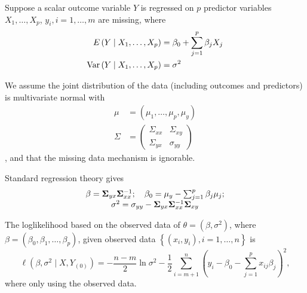 \begin{example}
	Suppose a scalar outcome variable $Y$ is regressed on $p$ predictor variables $X_{1},\ldots,X_{p}$, $y_{i},i=1,\ldots,m$ are missing, where
	\begin{equation}
		\begin{aligned}
			E\left(Y \mid X_{1}, \ldots, X_{p}\right)    & =\beta_{0}+\sum_{j=1}^{p} \beta_{j} X_{j} \\
			\mathrm{Var}\left(Y \mid X_{1}, \ldots, X_{p}\right) & =\sigma^{2}
		\end{aligned}
	\end{equation}

	We assume the joint distribution of the data (including outcomes and predictors) is multivariate normal with
	\begin{equation}
		\begin{aligned}
			\mu    & =\left(\mu_{1}, \ldots, \mu_{p}, \mu_{y}\right) \\
			\Sigma & =\left(\begin{array}{ll}
				                \Sigma_{x x} & \Sigma_{x y} \\
				                \Sigma_{y x} & \sigma_{y y}
			                \end{array}\right)
		\end{aligned}
	\end{equation}
	, and that the missing data mechanism is ignorable.

	Standard regression theory gives
	\begin{equation}
		\begin{array}{c}
			\beta=\boldsymbol{\Sigma}_{y x} \boldsymbol{\Sigma}_{x x}^{-1} ; \quad \beta_{0}=\mu_{y}-\sum_{j=1}^{p} \beta_{j} \mu_{j} ; \\
			\sigma^{2}=\sigma_{y y}-\boldsymbol{\Sigma}_{y x} \boldsymbol{\Sigma}_{x x}^{-1} \boldsymbol{\Sigma}_{x y}
		\end{array}
	\end{equation}

	The loglikelihood based on the observed data of $\theta=\left(\beta,\sigma^{2}\right)$, where $\beta=\left(\beta_{0},\beta_{1},\ldots,\beta_{p}\right)$, given observed data $\left\{\left(x_{i},y_{i}\right),i=1,\ldots,n\right\}$ is
	\begin{equation}
		\ell(\beta, \sigma^{2} \mid X, Y_{(0)})=-\frac{n-m}{2}\ln\sigma^2-\frac{1}{2}\sum_{i=m+1}^{n}\left(y_{i}-\beta_{0}-\sum_{j=1}^{p}x_{ij}\beta_{j}\right)^2,
	\end{equation}
	where only using the observed data.


\end{example}
